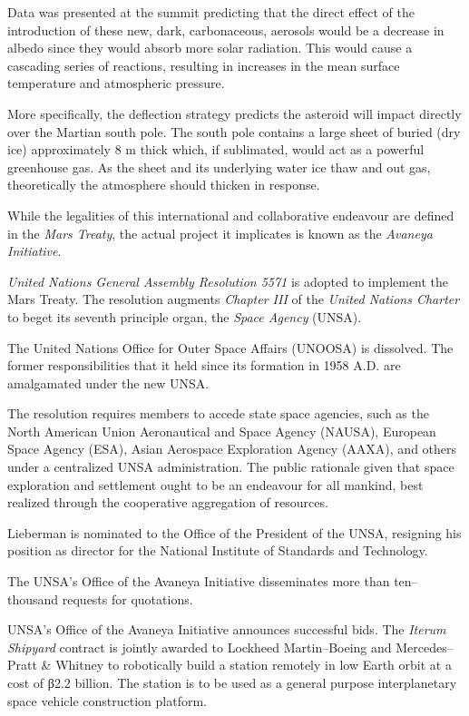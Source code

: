 Data was presented at the summit predicting that the direct effect of the introduction of these new, dark, carbonaceous, aerosols would be a decrease in albedo since they would absorb more solar radiation. This would cause a cascading series of reactions, resulting in increases in the mean surface temperature and atmospheric pressure.

More specifically, the deflection strategy predicts the asteroid will impact directly over the Martian south pole. The south pole contains a large sheet of buried  (dry ice) approximately 8 m thick which, if sublimated, would act as a powerful greenhouse gas. As the sheet and its underlying water ice thaw and out gas, theoretically the atmosphere should thicken in response.

While the legalities of this international and collaborative endeavour are defined in the {\it Mars Treaty}, the actual project it implicates is known as the {\it Avaneya Initiative}.
\StopTimelineDate

{\it United Nations General Assembly Resolution 5571} is adopted to implement the Mars Treaty. The resolution augments {\it Chapter III} of the {\it United Nations Charter} to beget its seventh principle organ, the {\it Space Agency} (UNSA).

The United Nations Office for Outer Space Affairs (UNOOSA) is dissolved. The former responsibilities that it held since its formation in 1958 A.D. are amalgamated under the new UNSA.

The resolution requires members to accede state space agencies, such as the North American Union Aeronautical and Space Agency (NAUSA), European Space Agency (ESA), Asian Aerospace Exploration Agency (AAXA), and others under a centralized UNSA administration. The public rationale given that space exploration and settlement ought to be an endeavour for all mankind, best realized through the cooperative aggregation of resources.

Lieberman is nominated to the Office of the President of the UNSA, resigning his position as director for the National Institute of Standards and Technology.
\StopTimelineDate

The UNSA's Office of the Avaneya Initiative disseminates more than ten--thousand requests for quotations.
\StopTimelineDate

UNSA's Office of the Avaneya Initiative announces successful bids. The {\it Iterum Shipyard} contract is jointly awarded to Lockheed Martin--Boeing and Mercedes--Pratt & Whitney to robotically build a station remotely in low Earth orbit at a cost of β2.2 billion. The station is to be used as a general purpose interplanetary space vehicle construction platform.

